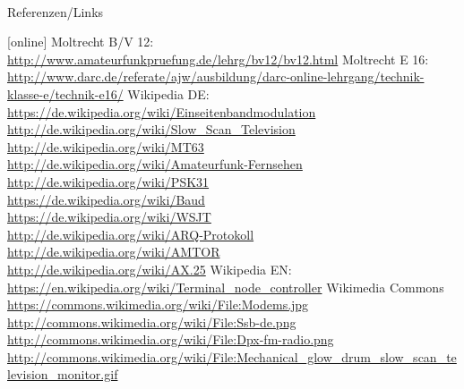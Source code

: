 \renewcommand{\refname}{Referenzen}

\hypertarget{refs}{}
\textcolor{white}{} \\ %
\Large Referenzen/Links
\footnotesize

\begin{thebibliography}{}
    [online]
      Moltrecht B/V 12: \\
                    \url{http://www.amateurfunkpruefung.de/lehrg/bv12/bv12.html}
       Moltrecht E 16: \\
                    \url{http://www.darc.de/referate/ajw/ausbildung/darc-online-lehrgang/technik-klasse-e/technik-e16/}
        Wikipedia DE: \\
                    \url{https://de.wikipedia.org/wiki/Einseitenbandmodulation}\\
                    \url{http://de.wikipedia.org/wiki/Slow_Scan_Television}\\
                    \url{http://de.wikipedia.org/wiki/MT63}\\
                    \url{http://de.wikipedia.org/wiki/Amateurfunk-Fernsehen}\\
                    \url{http://de.wikipedia.org/wiki/PSK31}\\
                    \url{https://de.wikipedia.org/wiki/Baud}\\
                    \url{https://de.wikipedia.org/wiki/WSJT}\\
                    \url{http://de.wikipedia.org/wiki/ARQ-Protokoll}\\
                    \url{http://de.wikipedia.org/wiki/AMTOR}\\
                    \url{http://de.wikipedia.org/wiki/AX.25}
        Wikipedia EN: \\
                    \url{https://en.wikipedia.org/wiki/Terminal_node_controller}
        Wikimedia Commons \\
                    \url{https://commons.wikimedia.org/wiki/File:Modems.jpg}\\
                    \url{http://commons.wikimedia.org/wiki/File:Ssb-de.png}\\
                    \url{http://commons.wikimedia.org/wiki/File:Dpx-fm-radio.png}\\
                    \url{http://commons.wikimedia.org/wiki/File:Mechanical_glow_drum_slow_scan_television_monitor.gif}\\

\end{thebibliography}
